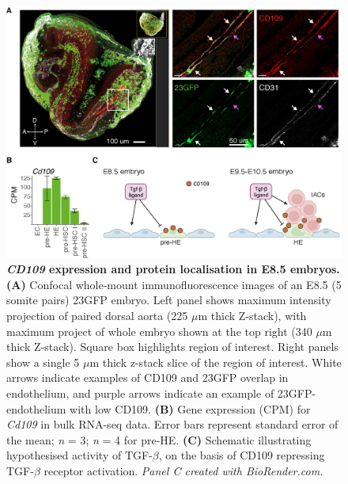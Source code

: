 \begin{figure}[t]
    \centering
    \includegraphics[width=\textwidth,height=\textheight,keepaspectratio]{figures/chapter3/ch3_cd109.png}
    \caption[{\textit{CD109} expression and protein localisation in E8.5 embryos.}]
    {\textbf{\textit{CD109} expression and protein localisation in E8.5 embryos.} 
    \textbf{(A)} Confocal whole‐mount immunofluorescence images of an E8.5 (5 somite pairs) 23GFP embryo. Left panel shows maximum intensity projection of paired dorsal aorta (225 $\mu$m thick Z‐stack), with maximum project of whole embryo shown at the top right (340 $\mu$m thick Z‐stack). Square box highlights region of interest. Right panels show a single 5 $\mu$m thick z-stack slice of the region of interest. White arrows indicate examples of CD109 and 23GFP overlap in endothelium, and purple arrows indicate an example of 23GFP- endothelium with low CD109. 
    \textbf{(B)} Gene expression (CPM) for \textit{Cd109} in bulk RNA-seq data. Error bars represent standard error of the mean; \textit{n} = 3; \textit{n} = 4 for pre-HE. 
    \textbf{(C)} Schematic illustrating hypothesised activity of TGF-$\beta$, on the basis of CD109 repressing TGF-$\beta$ receptor activation. \textit{Panel C created with BioRender.com.} 
    }
    \label{fig:ch3_cd109}
\end{figure}


